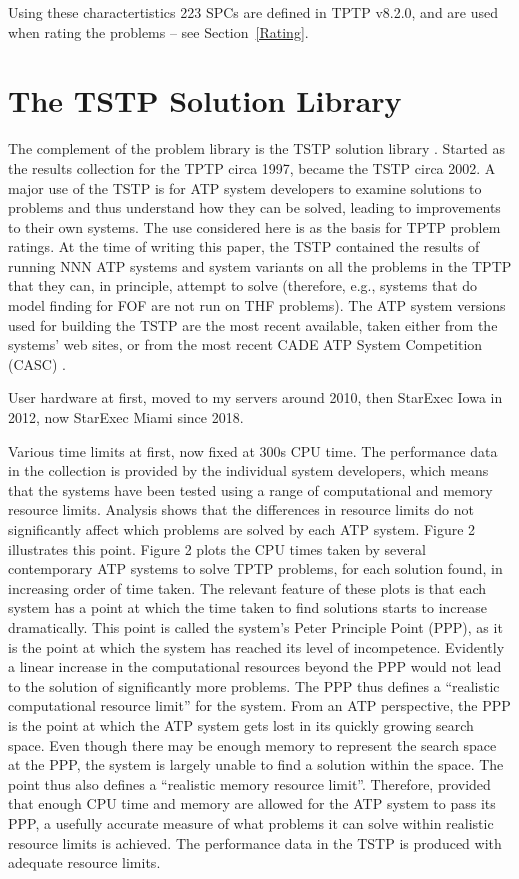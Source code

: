 \documentclass[runningheads]{llncs}
\begin{document}
Using these charactertistics 223 SPCs are defined in TPTP v8.2.0, and are used when rating
the problems -- see Section~\ref{Rating}.

\section{The TSTP Solution Library}
\label{TSTP}

The complement of the problem library is the TSTP solution library \cite{Sut07-CSR,Sut10}.
Started as the results collection for the TPTP circa 1997, became the TSTP circa 2002.
A major use of the TSTP is for ATP system developers to examine solutions to problems and thus 
understand how they can be solved, leading to improvements to their own systems. 
The use considered here is as the basis for TPTP problem ratings.
At the time of writing this paper, the TSTP contained the results of running NNN ATP systems and 
system variants on all the problems in the TPTP that they can, in principle, attempt to solve 
(therefore, e.g., systems that do model finding for FOF are not run on THF problems).
The ATP system versions used for building the TSTP are the most recent available, taken either 
from the systems’ web sites, or from the most recent CADE ATP System Competition (CASC) 
\cite{Sut16}.

User hardware at first, moved to my servers around 2010, then StarExec Iowa \cite{SST14} in 2012,
now StarExec Miami since 2018.

Various time limits at first, now fixed at 300s CPU time.
The performance data in the collection is provided by the individual system developers, which 
means that the systems have been tested using a range of computational and memory resource limits. 
Analysis shows that the differences in resource limits do not significantly affect which problems 
are solved by each ATP system. Figure 2 illustrates this point.
Figure 2 plots the CPU times taken by several contemporary ATP systems to solve TPTP problems, 
for each solution found, in increasing order of time taken. 
The relevant feature of these plots is that each system has a point at which the time taken to 
find solutions starts to increase dramatically. 
This point is called the system's Peter Principle \cite{PH69} Point (PPP), as it is the point at 
which the system has reached its level of incompetence. 
Evidently a linear increase in the computational resources beyond the PPP would not lead to the 
solution of significantly more problems. 
The PPP thus defines a ``realistic computational resource limit'' for the system. 
From an ATP perspective, the PPP is the point at which the ATP system gets lost in its quickly 
growing search space. 
Even though there may be enough memory to represent the search space at the PPP, the system is 
largely unable to find a solution within the space. 
The point thus also defines a ``realistic memory resource limit''. 
Therefore, provided that enough CPU time and memory are allowed for the ATP system to pass its 
PPP, a usefully accurate measure of what problems it can solve within realistic resource limits 
is achieved.
The performance data in the TSTP is produced with adequate resource limits.
\end{document}
